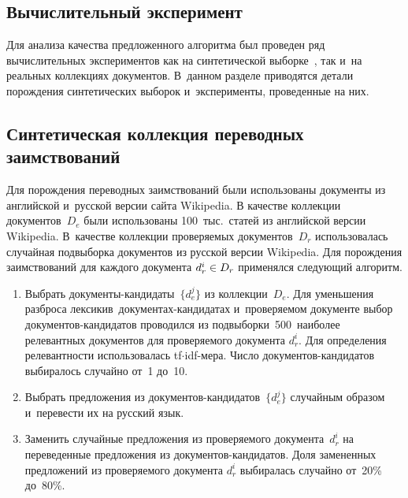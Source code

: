 \begin{multicols}{2}

\vspace*{-6pt}

\section{Вычислительный эксперимент}

Для анализа качества предложенного алгоритма был проведен ряд вычислительных 
экспериментов как на синтетической выборке~\cite{dataset}, так и~на реальных 
коллекциях документов.
В~данном разделе приводятся детали порождения синтетических выборок 
и~эксперименты, проведенные на них.

\vspace*{-6pt}

\subsection{Синтетическая коллекция переводных заимствований}

Для порождения переводных заимствований были использованы документы из 
английской и~русской версии сайта Wikipedia.
В качестве коллекции документов~$D_e$ были использованы 100~тыс.\ статей из 
английской версии Wikipedia.
В~качестве коллекции проверяемых документов~$D_r$ использовалась случайная 
подвыборка документов из русской версии Wikipedia. Для порождения заимствований 
для каждого документа $d_r^i \hm\in D_r$ применялся следующий алгоритм.
\begin{enumerate}
\item Выбрать документы-кан\-ди\-да\-ты~$\{d_e^j\}$ из коллекции~$D_e$. Для уменьшения 
разброса лексики\linebreak в~до\-ку\-мен\-тах-кан\-ди\-да\-тах и~проверяемом до\-ку\-менте выбор 
до\-ку\-мен\-тов-кан\-ди\-да\-тов проводился  из подвыборки~500~наиболее релевантных 
документов для проверяемого документа $d_r^i$. Для определения релевантности 
использовалась tf\;$\cdot$\;idf-ме\-ра. Чис\-ло до\-ку\-мен\-тов-кан\-ди\-да\-тов 
выбиралось случайно от~1 до~10.
\item Выбрать предложения из до\-ку\-мен\-тов-кан\-ди\-да\-тов~$\{d_e^j\}$ случайным образом и~перевести их на русский язык.
\item Заменить случайные предложения из проверяемого документа~$d_r^i$ на 
переведенные предложения из до\-ку\-мен\-тов-кан\-ди\-да\-тов. Доля замененных 
предложений из про\-ве\-ря\-емо\-го документа $d_r^i$ выбиралась случайно от~20\% до~80\%.
\end{enumerate}


\end{multicols}
